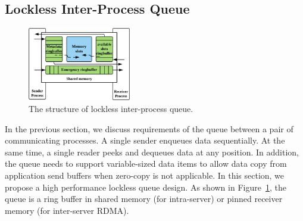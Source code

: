 


\subsection{Lockless Inter-Process Queue}
\label{subsec:lockless-queue}

\begin{figure}[t]
	\centering
	\includegraphics[width=0.4\textwidth]{images/locklessq}
	\caption{The structure of lockless inter-process queue.}
	\vspace{-15pt}
	\label{fig:locklessq-structure}
\end{figure}

In the previous section, we discuss requirements of the queue between a pair of communicating processes. A single sender enqueues data sequentially. At the same time, a single reader peeks and dequeues data at any position. In addition, the queue needs to support variable-sized data items to allow data copy from application send buffers when zero-copy is not applicable. In this section, we propose a high performance lockless queue design. As shown in Figure~\ref{fig:locklessq-structure}, the queue is a ring buffer in shared memory (for intra-server) or pinned receiver memory (for inter-server RDMA).

